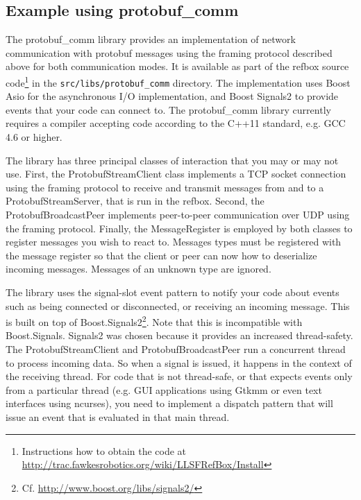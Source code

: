 \documentclass[a4paper]{article}
\begin{document}
\subsection{Example using protobuf\_comm}
The protobuf\_comm library provides an implementation of network
communication with protobuf messages using the framing protocol
described above for both communication modes. It is available as part
of the refbox source code\footnote{Instructions how to obtain the code
  at \url{http://trac.fawkesrobotics.org/wiki/LLSFRefBox/Install}} in
the \texttt{src/libs/protobuf\_comm} directory. The implementation
uses Boost Asio for the asynchronous I/O implementation, and Boost
Signals2 to provide events that your code can connect to. The
protobuf\_comm library currently requires a compiler accepting code
according to the C++11 standard, e.g. GCC 4.6 or higher.

The library has three principal classes of interaction that you may or
may not use. First, the ProtobufStreamClient class implements a TCP
socket connection using the framing protocol to receive and transmit
messages from and to a ProtobufStreamServer, that is run in the
refbox. Second, the ProtobufBroadcastPeer implements peer-to-peer
communication over UDP using the framing protocol. Finally, the
MessageRegister is employed by both classes to register messages you
wish to react to. Messages types must be registered with the message
register so that the client or peer can now how to deserialize
incoming messages. Messages of an unknown type are ignored.

The library uses the signal-slot event pattern to notify your code
about events such as being connected or disconnected, or receiving an
incoming message. This is built on top of
Boost.Signals2\footnote{Cf. \url{http://www.boost.org/libs/signals2/}}. Note
that this is incompatible with Boost.Signals. Signals2 was chosen
because it provides an increased thread-safety. The
ProtobufStreamClient and ProtobufBroadcastPeer run a concurrent thread
to process incoming data. So when a signal is issued, it happens in
the context of the receiving thread. For code that is not thread-safe,
or that expects events only from a particular thread (e.g. GUI
applications using Gtkmm or even text interfaces using ncurses), you
need to implement a dispatch pattern that will issue an event that is
evaluated in that main thread.
\end{document}
